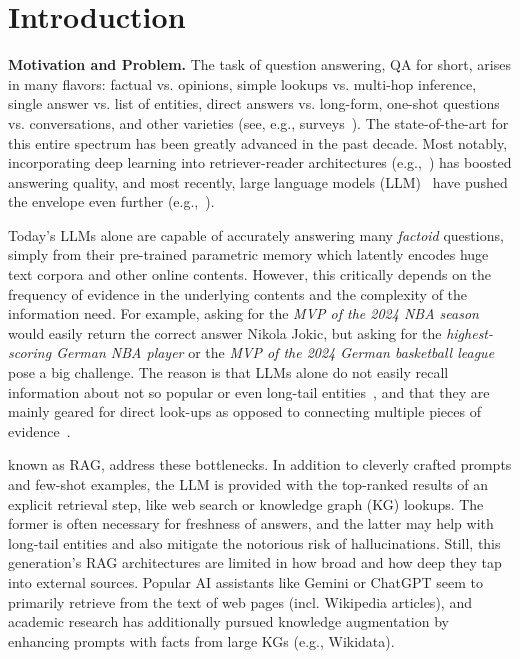 \label{sec:intro}
\section{Introduction}

\noindent\textbf{Motivation and Problem.} The task of question answering, QA for short, arises in many flavors: factual vs. opinions, simple lookups vs. multi-hop inference, single answer vs. list of entities, 
direct answers vs. long-form, one-shot questions vs. conversations, and other varieties 
(see, e.g., surveys~\cite{RogersGA:CS2023,RoyAnand:MC2021}).
The state-of-the-art for this entire spectrum has been greatly advanced in the past decade. Most notably, incorporating deep learning into retriever-reader architectures (e.g.,~\cite{DBLP:conf/acl/ChenFWB17,DBLP:conf/eacl/IzacardG21,DBLP:conf/emnlp/KarpukhinOMLWEC20}) has boosted answering quality, and most recently, large language models (LLM)~\cite{Minaee-LLM-survey,Zhao-LLMsurvey} have pushed the envelope even further (e.g.,~\cite{DBLP:journals/arXiv/abs-2305-06984}).

Today’s LLMs alone are capable of accurately answering many \textit{factoid} questions, simply from their pre-trained parametric memory which latently encodes huge text corpora and other online contents.
However, this critically depends on the frequency of evidence in the underlying contents and the complexity of the information need. 
For example, 
asking for the {\em MVP of the 2024 NBA season} would easily return the correct answer Nikola Jokic, 
but asking for the {\em highest-scoring German NBA player} or the {\em MVP of the 2024 German basketball league} pose a big challenge.
The reason is that LLMs alone do not easily recall information about not so popular or even long-tail entities~\cite{Kandpal:ICML2023,Sun:NAACL2024},
and that they are mainly geared for direct look-ups as opposed to connecting multiple pieces of evidence~\cite{Mavi:FnT2024,Zhang:NAACL2024}.

\cite{DBLP:journals/arXiv/abs-2312-10997,Guu-REALM:ICML2020,DBLP:conf/nips/LewisPPPKGKLYR020,Zhao:arxiv2024}
known as RAG, address these bottlenecks. In addition to cleverly crafted prompts and few-shot examples, the LLM is provided with the top-ranked results of an explicit retrieval step, like web search or knowledge graph (KG) lookups. The former is often necessary for freshness of answers, and the latter may help with long-tail entities and also mitigate the notorious risk of hallucinations. Still, this generation’s RAG architectures are limited in how broad and how deep they tap into external sources. Popular AI assistants like Gemini or ChatGPT seem to primarily retrieve from the text of web pages (incl. Wikipedia articles), and academic research has additionally pursued knowledge augmentation by enhancing prompts with facts from large KGs (e.g., Wikidata).

